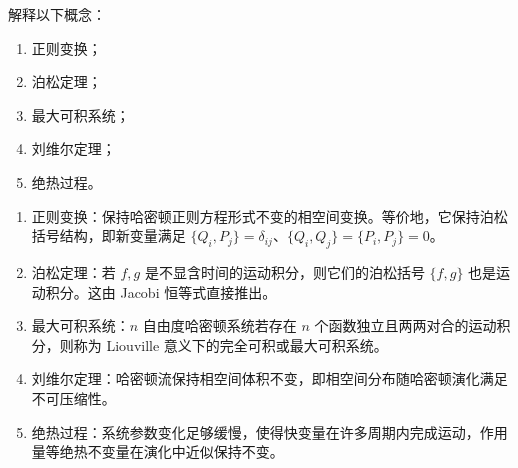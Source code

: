 
\begin{question}[概念解释]
解释以下概念：
\begin{enumerate}
  \item 正则变换；
  \item 泊松定理；
  \item 最大可积系统；
  \item 刘维尔定理；
  \item 绝热过程。
\end{enumerate}

\begin{solution}
\begin{enumerate}
  \item 正则变换：保持哈密顿正则方程形式不变的相空间变换。等价地，它保持泊松括号结构，即新变量满足 $\{Q_i,P_j\}=\delta_{ij}$、$\{Q_i,Q_j\}=\{P_i,P_j\}=0$。
  \item 泊松定理：若 $f,g$ 是不显含时间的运动积分，则它们的泊松括号 $\{f,g\}$ 也是运动积分。这由 Jacobi 恒等式直接推出。
  \item 最大可积系统：$n$ 自由度哈密顿系统若存在 $n$ 个函数独立且两两对合的运动积分，则称为 Liouville 意义下的完全可积或最大可积系统。
  \item 刘维尔定理：哈密顿流保持相空间体积不变，即相空间分布随哈密顿演化满足不可压缩性。
  \item 绝热过程：系统参数变化足够缓慢，使得快变量在许多周期内完成运动，作用量等绝热不变量在演化中近似保持不变。
\end{enumerate}

\end{solution}
\end{question}

